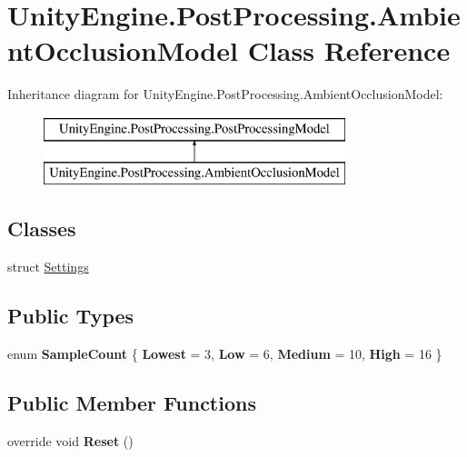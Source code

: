 \hypertarget{class_unity_engine_1_1_post_processing_1_1_ambient_occlusion_model}{}\section{Unity\+Engine.\+Post\+Processing.\+Ambient\+Occlusion\+Model Class Reference}
\label{class_unity_engine_1_1_post_processing_1_1_ambient_occlusion_model}
Inheritance diagram for Unity\+Engine.\+Post\+Processing.\+Ambient\+Occlusion\+Model\+:\begin{figure}[H]
\begin{center}
\leavevmode
\includegraphics[height=2.000000cm]{class_unity_engine_1_1_post_processing_1_1_ambient_occlusion_model}
\end{center}
\end{figure}
\subsection*{Classes}
\begin{DoxyCompactItemize}
\item 
struct \mbox{\hyperlink{struct_unity_engine_1_1_post_processing_1_1_ambient_occlusion_model_1_1_settings}{Settings}}
\end{DoxyCompactItemize}
\subsection*{Public Types}
\begin{DoxyCompactItemize}
\item 
\mbox{\label{class_unity_engine_1_1_post_processing_1_1_ambient_occlusion_model_abdde0f4c8184e60edc0466c88c55140f}} 
enum {\bfseries Sample\+Count} \{ {\bfseries Lowest} = 3, 
{\bfseries Low} = 6, 
{\bfseries Medium} = 10, 
{\bfseries High} = 16
 \}
\end{DoxyCompactItemize}
\subsection*{Public Member Functions}
\begin{DoxyCompactItemize}
\item 
\mbox{\label{class_unity_engine_1_1_post_processing_1_1_ambient_occlusion_model_acd50412ffa1f482d1d7561c48cc7f731}} 
override void {\bfseries Reset} ()
\end{DoxyCompactItemize}
